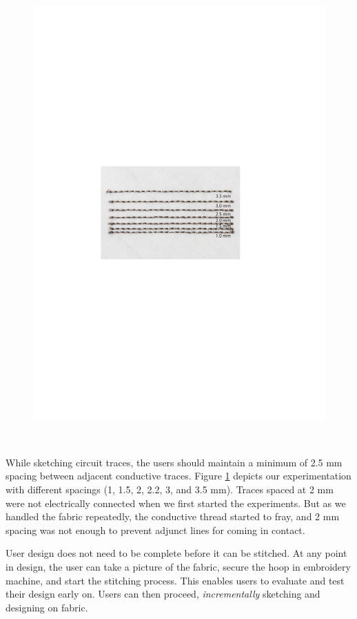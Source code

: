\documentclass[header.tex]{subfiles}
\begin{document}
 \begin{figure}
\centering
  \includegraphics[width=0.7\columnwidth]{figures/Spacing}
  \caption{}~\label{fig:Spacing}
  \vspace{-2.5em}
\end{figure}

While sketching circuit traces, the users should maintain a minimum of 2.5 mm spacing between adjacent conductive traces. Figure \ref{fig:Spacing} depicts our experimentation with different spacings (1, 1.5, 2, 2.2, 3, and 3.5 mm). Traces spaced at 2 mm were not electrically connected when we first started the experiments. But as we handled the fabric repeatedly, the conductive thread started to fray, and 2 mm spacing was not enough to prevent adjunct lines for coming in contact. 

User design does not need to be complete before it can be stitched. At any point in design, the user can take a picture of the fabric, secure the hoop in embroidery machine, and start the stitching process. This enables users to evaluate and test their design early on. Users can then proceed, \textit{incrementally} sketching and designing on fabric.
\end{document}
